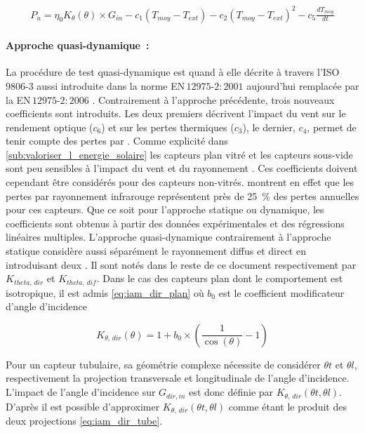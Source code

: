 \begin{equation}\label{eq:instantanee_complete}
    \begin{aligned}
        P_{u} = \eta_{0} K_{\theta}(\theta) \times G_{in} - c_{1} (T_{moy} - T_{ext}) - c_{2} (T_{moy}
                - T_{ext})^{2} - c_{5}\frac{dT_{moy}}{dt}
    \end{aligned}
\end{equation}


\paragraph{Approche quasi-dynamique~:} %
\label{par:approche_quasi_dynamique}
La procédure de test quasi-dynamique est quand à elle décrite à travers l’ISO\,$9806$-$3$
aussi introduite dans la norme EN\,$12975$-$2:2001$ \parencite{EN1297522001} aujourd’hui
remplacée par la EN\,$12975$-$2:2006$ \parencite{EN1297522006}.
Contrairement à l’approche précédente, trois nouveaux coefficients sont introduits.
Les deux premiers décrivent l’impact du vent sur le rendement optique ($c_{6}$) et sur
les pertes thermiques ($c_{3}$), le dernier, $c_{4}$, permet de tenir compte des pertes
par . Comme explicité dans \ref{sub:valoriser_l_energie_solaire}
les capteurs plan vitré et les capteurs sous-vide sont peu sensibles à l’impact du
vent et du rayonnement . Ces coefficients doivent cependant être considérés
pour des capteurs non-vitrés. \textcite{Hunn197733} montrent en effet que les pertes
par rayonnement infrarouge représentent près de \SI{25}{\percent} des pertes annuelles
pour ces capteurs. Que ce soit pour l’approche statique ou dynamique, les coefficients
sont obtenus à partir des données expérimentales et des régressions linéaires multiples.
L’approche quasi-dynamique contrairement à l’approche statique considère aussi séparément
le rayonnement diffus et direct en introduisant deux . Il sont notés dans le reste
de ce document respectivement par $K_{theta,\,dir}$ et $K_{theta,\,dif}$.
Dans le cas des capteurs plan dont le comportement est
isotropique, il est admis \eqref{eq:iam_dir_plan} où $b_{0}$ est le coefficient
modificateur d’angle d’incidence \parencite{Zambolin20101382}

\begin{equation}\label{eq:iam_dir_plan}
    K_{\theta,\,dir} (\theta) = 1 + b_{0} \times \left(\frac{1}{\cos(\theta)} - 1\right)
\end{equation}

Pour un capteur tubulaire, sa géométrie complexe nécessite de considérer $\theta t$ et
$\theta l$, respectivement la projection transversale et longitudinale de l’angle
d’incidence. L’impact de l’angle d’incidence sur $G_{dir, in}$ est donc définie par
$K_{\theta,\,dir} (\theta t, \theta l)$. D’après \textcite{McIntire1982315} il est possible
d’approximer $K_{\theta,\,dir} (\theta t, \theta l)$ comme étant le produit des deux
projections \eqref{eq:iam_dir_tube}.

